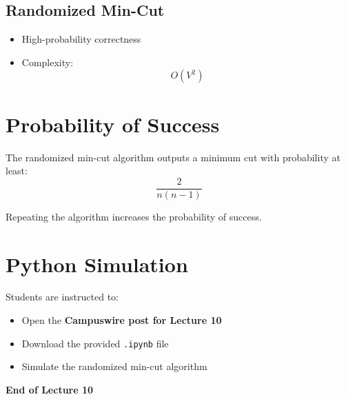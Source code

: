 \documentclass[11pt]{article}
\begin{document}
\subsection*{Randomized Min-Cut}

\begin{itemize}
    \item High-probability correctness
    \item Complexity:
    \[
    O(V^2)
    \]
\end{itemize}


\section{Probability of Success}

The randomized min-cut algorithm outputs a minimum cut with probability at least:
\[
\frac{2}{n(n-1)}
\]

\noindent
Repeating the algorithm increases the probability of success.


\section{Python Simulation}

Students are instructed to:
\begin{itemize}
    \item Open the \textbf{Campuswire post for Lecture 10}
    \item Download the provided \texttt{.ipynb} file
    \item Simulate the randomized min-cut algorithm
\end{itemize}

\bigskip
\noindent
\textbf{End of Lecture 10}
\end{document}
